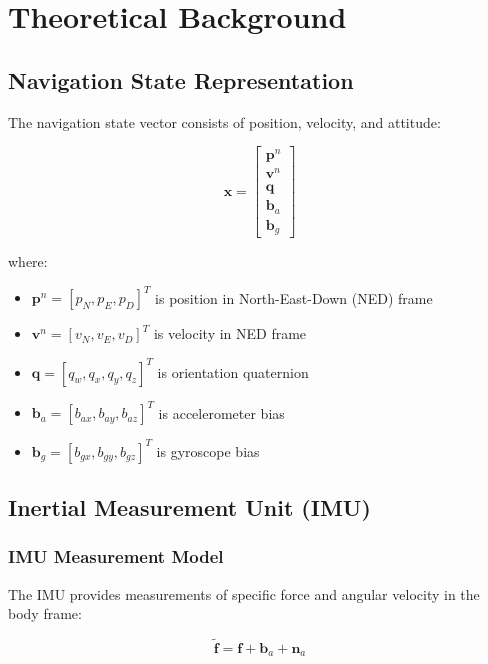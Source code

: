\documentclass[12pt,a4paper]{article}
\begin{document}
\section{Theoretical Background}

\subsection{Navigation State Representation}

The navigation state vector consists of position, velocity, and attitude:

\begin{equation}
\mathbf{x} = \begin{bmatrix}
\mathbf{p}^n \\
\mathbf{v}^n \\
\mathbf{q} \\
\mathbf{b}_a \\
\mathbf{b}_g
\end{bmatrix}
\end{equation}

where:
\begin{itemize}
    \item $\mathbf{p}^n = [p_N, p_E, p_D]^T$ is position in North-East-Down (NED) frame
    \item $\mathbf{v}^n = [v_N, v_E, v_D]^T$ is velocity in NED frame
    \item $\mathbf{q} = [q_w, q_x, q_y, q_z]^T$ is orientation quaternion
    \item $\mathbf{b}_a = [b_{ax}, b_{ay}, b_{az}]^T$ is accelerometer bias
    \item $\mathbf{b}_g = [b_{gx}, b_{gy}, b_{gz}]^T$ is gyroscope bias
\end{itemize}

\subsection{Inertial Measurement Unit (IMU)}

\subsubsection{IMU Measurement Model}

The IMU provides measurements of specific force and angular velocity in the body frame:

\begin{equation}
\tilde{\mathbf{f}} = \mathbf{f} + \mathbf{b}_a + \mathbf{n}_a
\end{equation}
\end{document}

